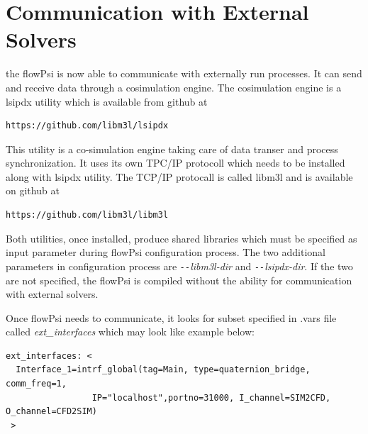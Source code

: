 \documentclass{article}
\begin{document}
\newpage
\section{Communication with External Solvers}
the flowPsi is now able to communicate with externally run processes. It can send and receive data
through a cosimulation engine. The cosimulation engine is a lsipdx utility\cite{Jirasek_2014}
which is available from github at \begin{verbatim}https://github.com/libm3l/lsipdx\end{verbatim}
This utility is a co-simulation engine taking care of data transer and process synchronization. 
It uses its own TPC/IP protocoll which needs to be installed along with lsipdx utility. 
The TCP/IP protocall is called libm3l and is available on github at
\begin{verbatim}https://github.com/libm3l/libm3l\end{verbatim}
Both utilities, once installed, produce shared libraries which must be specified as 
input parameter during flowPsi configuration process. The two additional parameters in configuration process are 
\emph{\texttt{-{}-}libm3l-dir} and \emph{\texttt{-{}-}lsipdx-dir}. 
If the two are not specified, the flowPsi is compiled without the ability for communication with external solvers.

Once flowPsi needs to communicate, it looks for subset specified in .vars file called \emph{ext\_interfaces} which
may look like example below:
 
\begin{verbatim}
ext_interfaces: <
  Interface_1=intrf_global(tag=Main, type=quaternion_bridge, comm_freq=1,
                 IP="localhost",portno=31000, I_channel=SIM2CFD, O_channel=CFD2SIM)
 > 
\end{verbatim}
\end{document}
